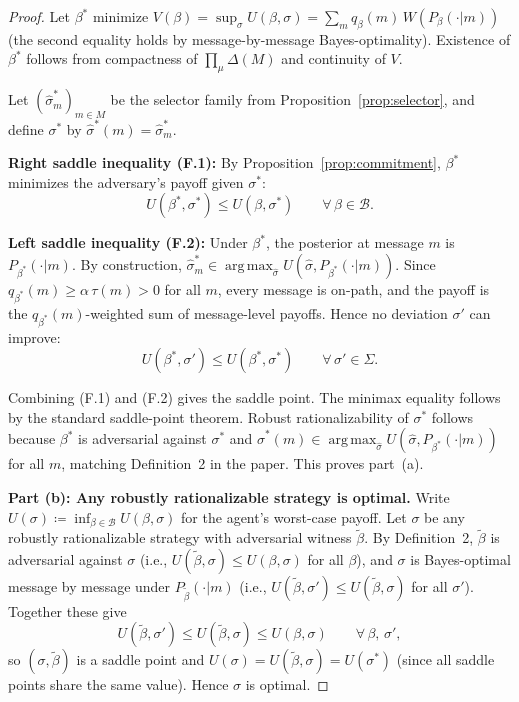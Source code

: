 \documentclass[12pt]{article}
\newcommand{\argmax}{\operatorname{arg\,max}}
\begin{document}
\begin{proof}
Let $\beta^*$ minimize $V(\beta) = \sup_\sigma U(\beta, \sigma) = \sum_m q_\beta(m)\, W(P_\beta(\cdot|m))$ (the second equality holds by message-by-message Bayes-optimality). Existence of $\beta^*$ follows from compactness of $\prod_\mu \Delta(M)$ and continuity of $V$.

Let $(\hat\sigma^*_m)_{m \in M}$ be the selector family from Proposition~\ref{prop:selector}, and define $\sigma^*$ by $\hat\sigma^*(m) = \hat\sigma^*_m$.

\medskip\noindent
\textbf{Right saddle inequality (F.1):}
By Proposition~\ref{prop:commitment}, $\beta^*$ minimizes the adversary's payoff given $\sigma^*$:
\[
U(\beta^*, \sigma^*) \leq U(\beta, \sigma^*) \qquad \forall\, \beta \in \mathcal{B}.
\]

\textbf{Left saddle inequality (F.2):}
Under $\beta^*$, the posterior at message $m$ is $P_{\beta^*}(\cdot|m)$. By construction, $\hat\sigma^*_m \in \argmax_{\hat\sigma} U(\hat\sigma, P_{\beta^*}(\cdot|m))$. Since $q_{\beta^*}(m) \geq \alpha\,\tau(m) > 0$ for all $m$, every message is on-path, and the payoff is the $q_{\beta^*}(m)$-weighted sum of message-level payoffs. Hence no deviation $\sigma'$ can improve:
\[
U(\beta^*, \sigma') \leq U(\beta^*, \sigma^*) \qquad \forall\, \sigma' \in \Sigma.
\]

Combining (F.1) and (F.2) gives the saddle point. The minimax equality follows by the standard saddle-point theorem. Robust rationalizability of $\sigma^*$ follows because $\beta^*$ is adversarial against $\sigma^*$ and $\hat\sigma^*(m) \in \argmax_{\hat\sigma} U(\hat\sigma, P_{\beta^*}(\cdot|m))$ for all $m$, matching Definition~2 in the paper. This proves part~(a).

\medskip\noindent
\textbf{Part (b): Any robustly rationalizable strategy is optimal.}
Write $U(\sigma) \coloneqq \inf_{\beta \in \mathcal{B}} U(\beta, \sigma)$ for the agent's worst-case payoff. Let $\sigma$ be any robustly rationalizable strategy with adversarial witness $\tilde\beta$. By Definition~2, $\tilde\beta$ is adversarial against $\sigma$ (i.e., $U(\tilde\beta, \sigma) \leq U(\beta, \sigma)$ for all $\beta$), and $\sigma$ is Bayes-optimal message by message under $P_{\tilde\beta}(\cdot|m)$ (i.e., $U(\tilde\beta, \sigma') \leq U(\tilde\beta, \sigma)$ for all $\sigma'$). Together these give
\[
U(\tilde\beta, \sigma') \leq U(\tilde\beta, \sigma) \leq U(\beta, \sigma) \qquad \forall\, \beta,\, \sigma',
\]
so $(\sigma, \tilde\beta)$ is a saddle point and $U(\sigma) = U(\tilde\beta, \sigma) = U(\sigma^*)$ (since all saddle points share the same value). Hence $\sigma$ is optimal.
\end{proof}
\end{document}
